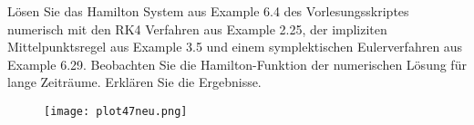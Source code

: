 \begin{exercise}
  Lösen Sie das Hamilton System aus Example 6.4 des Vorlesungsskriptes
  numerisch mit den RK4 Verfahren aus Example 2.25, der impliziten
  Mittelpunktsregel aus Example 3.5 und einem symplektischen
  Eulerverfahren aus Example 6.29. Beobachten Sie die
  Hamilton-Funktion der numerischen Lösung für lange Zeiträume.
  Erklären Sie die Ergebnisse.
\end{exercise}

\begin{solution}
\begin{figure}
    \centering
    \texttt{[image: plot47neu.png]}
\end{figure}
\FloatBarrier
\end{solution}
